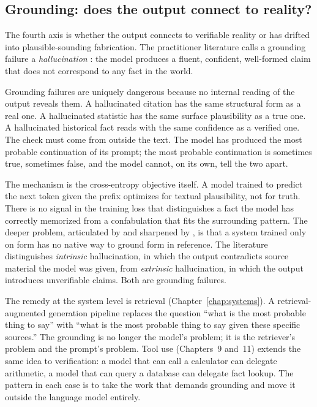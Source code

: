 \subsection{Grounding: does the output connect to reality?}

The fourth axis is whether the output connects to verifiable
reality or has drifted into plausible-sounding fabrication. The
practitioner literature calls a grounding failure a
\emph{hallucination} \citep{ji2023survey}: the model produces a
fluent, confident, well-formed claim that does not correspond to
any fact in the world.

Grounding failures are uniquely dangerous because no internal
reading of the output reveals them. A hallucinated citation has
the same structural form as a real one. A hallucinated statistic
has the same surface plausibility as a true one. A hallucinated
historical fact reads with the same confidence as a verified one.
The check must come from outside the text. The model has produced
the most probable continuation of its prompt; the most probable
continuation is sometimes true, sometimes false, and the model
cannot, on its own, tell the two apart.

The mechanism is the cross-entropy objective itself. A model
trained to predict the next token given the prefix optimizes for
textual plausibility, not for truth. There is no signal in the
training loss that distinguishes a fact the model has correctly
memorized from a confabulation that fits the surrounding pattern.
The deeper problem, articulated by \citet{harnad1990symbol} and
sharpened by \citet{bender2020climbing}, is that a system trained
only on form has no native way to ground form in reference. The
literature distinguishes \emph{intrinsic} hallucination, in which
the output contradicts source material the model was given, from
\emph{extrinsic} hallucination, in which the output introduces
unverifiable claims. Both are grounding failures.

The remedy at the system level is retrieval (Chapter~\ref{chap:systems}). A
retrieval-augmented generation pipeline replaces the question
``what is the most probable thing to say'' with ``what is the most
probable thing to say given these specific sources.'' The grounding
is no longer the model's problem; it is the retriever's problem
and the prompt's problem. Tool use (Chapters~9 and~11) extends the
same idea to verification: a model that can call a calculator can
delegate arithmetic, a model that can query a database can
delegate fact lookup. The pattern in each case is to take the work
that demands grounding and move it outside the language model
entirely.

